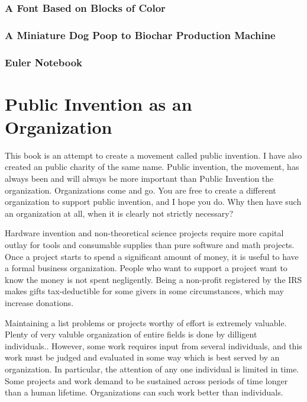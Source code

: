 \documentclass[
	fontsize=10pt, %
	twoside=false, %
	secnumdepth=1, %
]{kaobook}
\begin{document}
\subsection{A Font Based on Blocks of Color}

\subsection{A Miniature Dog Poop to Biochar Production Machine}

\subsection{Euler Notebook}




\chapter{Public Invention as an Organization}


This book is an attempt to create a movement called public invention.
I have also created an public charity of the same name.
Public invention, the movement, has always been and will always be more important than Public Invention the organization.
Organizations come and go.
You are free to create a different organization to support public invention, and I hope you do.
Why then have such an organization at all, when it is clearly not strictly necessary?

Hardware invention and non-theoretical science projects require more capital outlay
for tools and consumable supplies than pure software and math projects.
Once a project starts to spend a significant amount of money, it is useful to have a formal business organization.
People who want to support a project want to know the money is not spent negligently.
Being a non-profit registered by the IRS makes gifts tax-deductible for some givers in some circumstances,
which may increase donations.

Maintaining a list problems or projects worthy of effort is extremely valuable.
Plenty of very valuble organization of entire fields is done by dilligent individuals..
However, some work requires input from several individuals, and this work must be judged and evaluated
in some way which is best served by an organization.
In particular, the attention of any one
individual is limited in time.
Some projects and work demand to be sustained across periods of time longer than a human lifetime.
Organizations can such work better than individuals.
\end{document}
